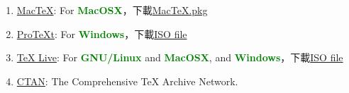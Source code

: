 \begin{enumerate}[leftmargin=0pt, topsep=0pt, itemsep=0pt, label=\Roman{*}.]
\begin{enumerate}[topsep=0pt, itemsep=0pt, label=\arabic{*}.]
     \item \href{http://www.tug.org/mactex/}{MacTeX}: For \textcolor{Green}{\textbf{MacOSX}}，下載\href{http://mirror.ctan.org/systems/mac/mactex/MacTeX.pkg}{MacTeX.pkg}
     \item \href{http://www.tug.org/protext/}{ProTeXt}: For \textcolor{Green}{\textbf{Windows}}，下載\href{ftp://ftp.fernuni-hagen.de/pub/windows/win32/ProTeXt/}{ISO file}
     \item \href{http://www.tug.org/texlive/}{TeX Live}: For \textcolor{Green}{\textbf{GNU/Linux}} and \textcolor{Green}{\textbf{MacOSX}}, and \textcolor{Green}{\textbf{Windows}}，下載\href{http://www.tug.org/texlive/acquire-iso.html}{ISO file}
     \item \href{http://ctan.org/}{CTAN}: The Comprehensive TeX Archive Network.\\
 \end{enumerate}


\end{enumerate}
